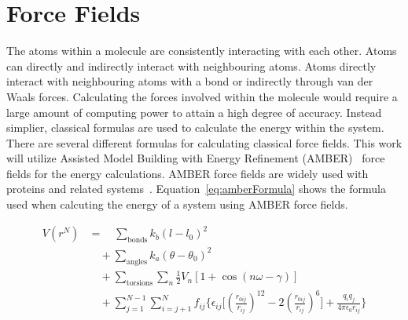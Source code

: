 \section{Force Fields}

The atoms within a molecule are consistently interacting with each other. Atoms can directly and indirectly interact with neighbouring atoms. Atoms directly interact with neighbouring atoms with a bond or indirectly through van der Waals forces. Calculating the forces involved within the molecule would require a large amount of computing power to attain a high degree of accuracy. Instead simplier, classical formulas are used to calculate the energy within the system. There are several different formulas for calculating classical force fields. This work will utilize Assisted Model Building with Energy Refinement (AMBER)~\cite{cornell1995second} force fields for the energy calculations. AMBER force fields are widely used with proteins and related systems~\cite{ponder2003force}. Equation~\ref{eq:amberFormula} shows the formula used when calcuting the energy of a system using AMBER force fields.

\begin{equation}
	\begin{split}
		\label{eq:amberFormula}
		V(r^N) &= \quad \sum_\text{bonds} k_b (l-l_0)^2 \\
		&\quad + \sum_\text{angles} k_a (\theta - \theta_0)^2 \\
		&\quad + \sum_\text{torsions} \sum_n \frac{1}{2} V_n [1+\cos(n \omega- \gamma)] \\
		&\quad + \sum_{j=1} ^{N-1} \sum_{i=j+1} ^N f_{ij}\biggl\{\epsilon_{ij}\biggl[\left(\frac{r_{0ij}}{r_{ij}} \right)^{12} - 2\left(\frac{r_{0ij}}{r_{ij}} \right)^{6} \biggr]+ \frac{q_iq_j}{4\pi \epsilon_0 r_{ij}}\biggr\}
	\end{split}
\end{equation}